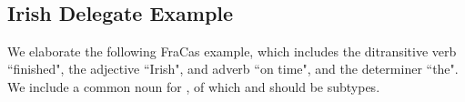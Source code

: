 \begin{code}
\AgdaSymbol{=}\AgdaSpace{}%
\<%
\\
%
\\[\AgdaEmptyExtraSkip]%
%
\>[2]\AgdaSpace{}%
\AgdaSymbol{:}\AgdaSpace{}%
\AgdaSpace{}%
\<%
\\
%
\>[2]\AgdaSpace{}%
\AgdaSymbol{=}\AgdaSpace{}%
\AgdaSpace{}%
\AgdaSymbol{\{}\AgdaSpace{}%
\AgdaSpace{}%
\AgdaSymbol{=}\AgdaSpace{}%
\AgdaSpace{}%
\AgdaSpace{}%
\AgdaSpace{}%
\AgdaSpace{}%
\AgdaSpace{}%
\AgdaOperator{\AgdaFunction{\$}}\AgdaSpace{}%
\AgdaSymbol{\}}\<%
\\
%
\\[\AgdaEmptyExtraSkip]%
%
\>[2]\AgdaSpace{}%
\AgdaSymbol{:}\AgdaSpace{}%
\AgdaSpace{}%
\<%
\\
%
\>[2]\AgdaSpace{}%
\AgdaSymbol{=}\AgdaSpace{}%
\AgdaSpace{}%
\AgdaSymbol{\{}\AgdaSpace{}%
\AgdaSpace{}%
\AgdaSymbol{=}\AgdaSpace{}%
\AgdaSpace{}%
\AgdaSpace{}%
\AgdaSpace{}%
\AgdaSpace{}%
\AgdaSpace{}%
\AgdaOperator{\AgdaFunction{\$}}\AgdaSpace{}%
\AgdaSymbol{\}}\<%
\\
%
\\[\AgdaEmptyExtraSkip]%
\>[0]\AgdaSpace{}%
\AgdaSymbol{:}\AgdaSpace{}%
\AgdaSpace{}%
\AgdaSpace{}%
%
\>[24]\AgdaSpace{}%
\AgdaSpace{}%
\AgdaSpace{}%
\<%
\\
\>[0]\AgdaSpace{}%
\AgdaSymbol{(}\AgdaSpace{}%
\AgdaOperator{\AgdaInductiveConstructor{,}}\AgdaSpace{}%
\AgdaSymbol{)}\AgdaSpace{}%
\AgdaSymbol{=}\AgdaSpace{}%
\AgdaSpace{}%
\AgdaSpace{}%
\AgdaOperator{\AgdaInductiveConstructor{,}}\AgdaSpace{}%
\<%
\end{code}

\subsection{Irish Delegate Example}

We elaborate the following FraCas example, which includes the ditransitive
verb ``finished", the adjective ``Irish", and adverb ``on time", and the
determiner ``the". We include a common noun for , of which
 and  should be subtypes.

